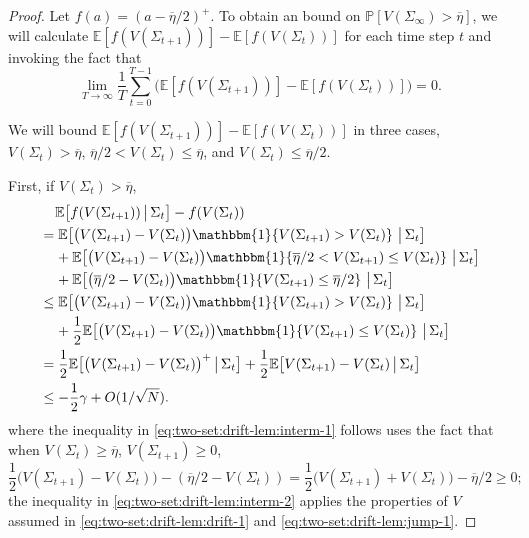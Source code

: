 \documentclass[11pt,letterpaper]{article}
\theoremstyle{plain}
\theoremstyle{definition}
\theoremstyle{remark}
\newcommand{\E}[1]{\mathbb{E}\left[#1\right]}
\newcommand{\Ebig}[1]{\mathbb{E}\big[#1\big]}
\newcommand{\givenbig}{\,\big|\,}
\newcommand{\Prob}[1]{\mathbb{P}\left[#1\right]}
\newcommand{\indibrac}[1]{\mathbbm{1}\!\left\{#1\right\}}
\newcommand{\threshbar}{\overline{\eta}}
\newcommand{\Fullstate}{\Sigma}
\begin{document}
\begin{proof}%
    Let $f(a) = (a-\threshbar/2)^+$. 
    To obtain an bound on $\Prob{V(\Fullstate_\infty) > \threshbar}$, we will calculate $\E{f(V(\Fullstate_{t+1}))} - \E{f(V(\Fullstate_{t}))}$ for each time step $t$ and invoking the fact that 
    \begin{equation}\label{eq:bar}
        \lim_{T\to\infty} \frac{1}{T} \sum_{t=0}^{T-1} \big(\E{f(V(\Fullstate_{t+1}))} - \E{f(V(\Fullstate_{t}))}\big) = 0.
    \end{equation}

    We will bound $\E{f(V(\Fullstate_{t+1}))} - \E{f(V(\Fullstate_{t}))}$ in three cases,  $V(\Fullstate_{t}) > \threshbar$, $\threshbar/2 < V(\Fullstate_{t}) \leq \threshbar$, and  $V(\Fullstate_{t}) \leq \threshbar/2$. 

    First, if $V(\Fullstate_{t}) > \threshbar$, 
    \begin{align}
        \nonumber
        &\mspace{20mu} \Ebig{f(V(\Fullstate_{t+1})) \givenbig \Fullstate_t} - f(V(\Fullstate_t)) \\
        \nonumber
        &= \Ebig{\big(V(\Fullstate_{t+1}) - V(\Fullstate_t)\big)\indibrac{V(\Fullstate_{t+1}) > V(\Fullstate_t)} \givenbig \Fullstate_t}  \\
        \nonumber
        &\mspace{20mu} + \Ebig{\big(V(\Fullstate_{t+1}) - V(\Fullstate_t)\big) \indibrac{\threshbar/2 < V(\Fullstate_{t+1}) \leq V(\Fullstate_t)} \givenbig \Fullstate_t}  \\
        \nonumber
        &\mspace{20mu} + \Ebig{\big(\threshbar/2 - V(\Fullstate_t)\big) \indibrac{V(\Fullstate_{t+1}) \leq \threshbar/2} \givenbig \Fullstate_t}  \\
        \nonumber
        &\leq \Ebig{\big(V(\Fullstate_{t+1}) - V(\Fullstate_t)\big)\indibrac{V(\Fullstate_{t+1}) > V(\Fullstate_t)} \givenbig \Fullstate_t}  \\
        \label{eq:two-set:drift-lem:interm-1}
        &\mspace{20mu} + \frac{1}{2} \Ebig{\big(V(\Fullstate_{t+1}) - V(\Fullstate_t)\big) \indibrac{ V(\Fullstate_{t+1}) \leq V(\Fullstate_t)} \givenbig \Fullstate_t}  \\
        &= \frac{1}{2}\Ebig{\big(V(\Fullstate_{t+1}) - V(\Fullstate_t)\big)^+ \givenbig \Fullstate_t}  + \frac{1}{2} \Ebig{V(\Fullstate_{t+1}) - V(\Fullstate_t) \givenbig \Fullstate_t} \\
        \label{eq:two-set:drift-lem:interm-2}
        &\leq -\frac{1}{2}\gamma  + O(1/\sqrt{N}).
    \end{align}
    where the inequality in \eqref{eq:two-set:drift-lem:interm-1} follows uses the fact that when $V(\Fullstate_{t}) \geq \threshbar$, $V(\Fullstate_{t+1}) \geq 0$, 
    \[
        \frac{1}{2}\big(V(\Fullstate_{t+1}) - V(\Fullstate_t)\big) - (\threshbar/2 - V(\Fullstate_t)) = \frac{1}{2}\big(V(\Fullstate_{t+1}) + V(\Fullstate_t)\big) - \threshbar/2 \geq 0;
    \]
    the inequality in \eqref{eq:two-set:drift-lem:interm-2} applies the properties of $V$ assumed in \eqref{eq:two-set:drift-lem:drift-1} and \eqref{eq:two-set:drift-lem:jump-1}. 


\end{proof}
\end{document}
